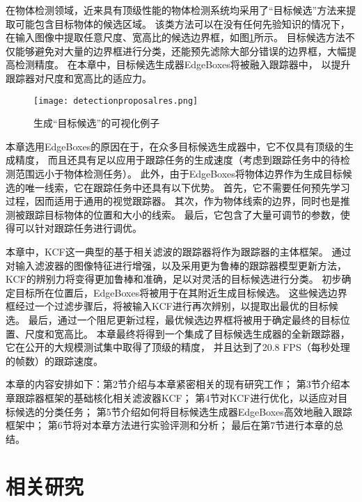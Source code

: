 在物体检测领域，近来具有顶级性能的物体检测系统均采用了``目标候选''方法来提取可能包含目标物体的候选区域。
该类方法可以在没有任何先验知识的情况下，在输入图像中提取任意尺度、宽高比的候选边界框，如图\ref{detectionproposalres}所示。
目标候选方法不仅能够避免对大量的边界框进行分类，还能预先滤除大部分错误的边界框，大幅提高检测精度。
在本章中，目标候选生成器EdgeBoxes将被融入跟踪器中，
以提升跟踪器对尺度和宽高比的适应力。

\begin{figure}[htb]
\centering
\texttt{[image: detectionproposalres.png]}
\caption{生成``目标候选''的可视化例子}
\label{detectionproposalres}
\end{figure}

本章选用EdgeBoxes的原因在于，在众多目标候选生成器中，它不仅具有顶级的生成精度，
而且还具有足以应用于跟踪任务的生成速度（考虑到跟踪任务中的待检测范围远小于物体检测任务）。
此外，由于EdgeBoxes将物体边界作为生成目标候选的唯一线索，它在跟踪任务中还具有以下优势。
首先，它不需要任何预先学习过程，因而适用于通用的视觉跟踪器。
其次，作为物体线索的边界，同时也是推测被跟踪目标物体的位置和大小的线索。
最后，它包含了大量可调节的参数，使得可以针对跟踪任务进行调优。

本章中，KCF这一典型的基于相关滤波的跟踪器将作为跟踪器的主体框架。
通过对输入滤波器的图像特征进行增强，以及采用更为鲁棒的跟踪器模型更新方法，
KCF的辨别力将变得更加鲁棒和准确，足以对灵活的目标候选进行分类。
初步确定目标所在位置后，EdgeBoxes将被用于在其附近生成目标候选。
这些候选边界框经过一个过滤步骤后，将被输入KCF进行再次辨别，以提取出最优的目标候选。
最后，通过一个阻尼更新过程，最优候选边界框将被用于确定最终的目标位置、尺度和宽高比。
本章最终将得到一个集成了目标候选生成器的全新跟踪器，它在公开的大规模测试集中取得了顶级的精度，
并且达到了20.8 FPS（每秒处理的帧数）的跟踪速度。

本章的内容安排如下：第2节介绍与本章紧密相关的现有研究工作；
第3节介绍本章跟踪器框架的基础\pozhehao 核化相关滤波器KCF；
第4节对KCF进行优化，以适应对目标候选的分类任务；
第5节介绍如何将目标候选生成器EdgeBoxes高效地融入跟踪框架中；
第6节将对本章方法进行实验评测和分析；
最后在第7节进行本章的总结。

\section{相关研究}
